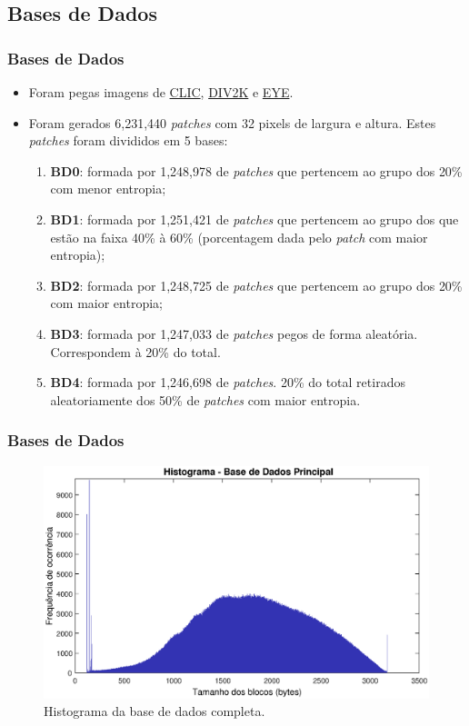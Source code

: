 \documentclass{beamer}
\begin{document}
\subsection{Bases de Dados}
\begin{frame}
\frametitle{Bases de Dados}
\begin{itemize}
\item Foram pegas imagens de \href{https://www.compression.cc/}{CLIC}, \href{https://data.vision.ee.ethz.ch/cvl/DIV2K/}{DIV2K} e \href{https://mmspg.epfl.ch/downloads/ultra-eye/}{EYE}.
\item Foram gerados 6,231,440 \textit{patches} com 32 pixels de largura e altura. Estes \textit{patches} foram divididos em 5 bases:
\begin{enumerate}
    \item \textbf{BD0}: formada por 1,248,978 de \textit{patches} que pertencem ao grupo dos 20\% com menor entropia;
    \item \textbf{BD1}: formada por 1,251,421 de \textit{patches} que pertencem ao grupo dos que estão na faixa 40\% à 60\% (porcentagem dada pelo \textit{patch} com maior entropia);
    \item \textbf{BD2}: formada por 1,248,725 de \textit{patches} que pertencem ao grupo dos 20\% com maior entropia;
    \item \textbf{BD3}: formada por 1,247,033 de \textit{patches} pegos de forma aleatória. Correspondem à 20\% do total.
    \item \textbf{BD4}: formada por 1,246,698 de \textit{patches}. 20\% do total retirados aleatoriamente dos 50\% de \textit{patches} com maior entropia.
\end{enumerate}
\end{itemize}
\end{frame}
\begin{frame}
\frametitle{Bases de Dados}
\begin{figure}
\includegraphics[width=\textwidth]{figs/hist.eps}
\caption{Histograma da base de dados completa.}
\end{figure}
\end{frame}
\end{document}
